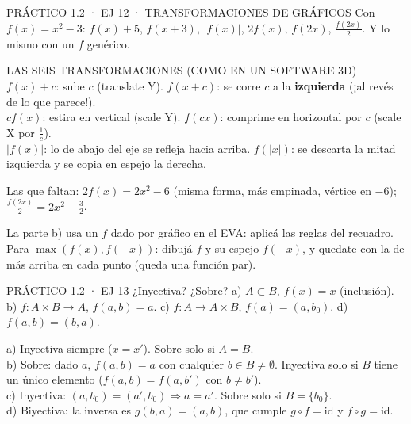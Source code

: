 \begin{enunciado}{PRÁCTICO 1.2 · EJ 12 · TRANSFORMACIONES DE GRÁFICOS}
Con $f(x)=x^2-3$: $f(x)+5$, $f(x+3)$, $|f(x)|$, $2f(x)$, $f(2x)$, $\frac{f(2x)}2$. Y lo mismo con un $f$ genérico.
\end{enunciado}
\begin{memo}{LAS SEIS TRANSFORMACIONES (COMO EN UN SOFTWARE 3D)}
$f(x)+c$: sube $c$ (translate Y). \quad $f(x+c)$: se corre $c$ a la \textbf{izquierda} (¡al revés de lo que parece!).\\
$cf(x)$: estira en vertical (scale Y). \quad $f(cx)$: comprime en horizontal por $c$ (scale X por $\frac1c$).\\
$|f(x)|$: lo de abajo del eje se refleja hacia arriba. \quad $f(|x|)$: se descarta la mitad izquierda y se copia en espejo la derecha.
\end{memo}
\begin{center}
\end{center}
Las que faltan: $2f(x)=2x^2-6$ (misma forma, más empinada, vértice en $-6$); $\frac{f(2x)}2=2x^2-\frac32$.
\begin{falta}
La parte b) usa un $f$ dado por gráfico en el EVA: aplicá las reglas del recuadro. Para $\max(f(x),f(-x))$: dibujá $f$ y su espejo $f(-x)$, y quedate con la de más arriba en cada punto (queda una función par).
\end{falta}

\begin{enunciado}{PRÁCTICO 1.2 · EJ 13}
¿Inyectiva? ¿Sobre? a) $A\subset B$, $f(x)=x$ (inclusión). b) $f:A\times B\to A$, $f(a,b)=a$. c) $f:A\to A\times B$, $f(a)=(a,b_0)$. d) $f(a,b)=(b,a)$.
\end{enunciado}
a) Inyectiva siempre ($x=x'$). Sobre solo si $A=B$.\\
b) Sobre: dado $a$, $f(a,b)=a$ con cualquier $b\in B\neq\emptyset$. Inyectiva solo si $B$ tiene un único elemento ($f(a,b)=f(a,b')$ con $b\neq b'$).\\
c) Inyectiva: $(a,b_0)=(a',b_0)\Rightarrow a=a'$. Sobre solo si $B=\{b_0\}$.\\
d) Biyectiva: la inversa es $g(b,a)=(a,b)$, que cumple $g\circ f=\mathrm{id}$ y $f\circ g=\mathrm{id}$.


